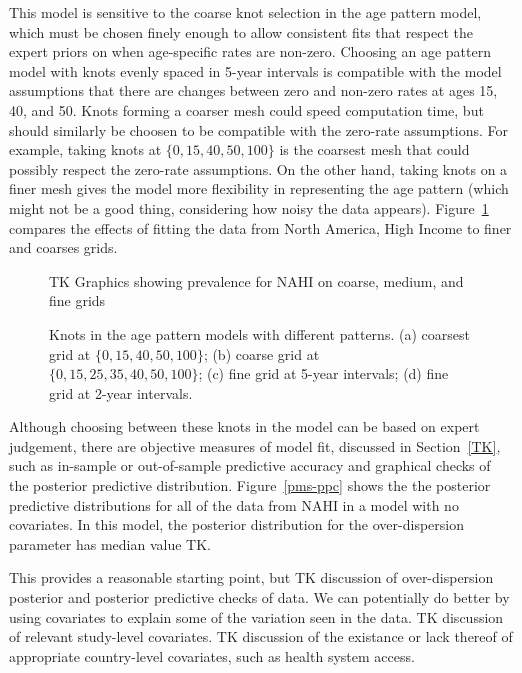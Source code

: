 This model is sensitive to the coarse knot selection in the age
pattern model, which must be chosen finely enough to allow consistent
fits that respect the expert priors on when age-specific rates are
non-zero.  Choosing an age pattern model with knots evenly spaced in
5-year intervals is compatible with the model assumptions that there
are changes between zero and non-zero rates at ages 15, 40, and 50.
Knots forming a coarser mesh could speed computation time, but should similarly be
choosen to be compatible with the zero-rate assumptions.  For example,
taking knots at $\{0,15,40,50,100\}$ is the coarsest mesh that could
possibly respect the zero-rate assumptions.  On the other hand, taking
knots on a finer mesh gives the model more flexibility in representing
the age pattern (which might not be a good thing, considering how
noisy the data appears).  Figure~\ref{pms-grids} compares the effects
of fitting the data from North America, High Income to finer and coarses grids.
\begin{figure}
\begin{center}
TK Graphics showing prevalence for NAHI on coarse, medium, and fine grids
\end{center}
\caption{Knots in the age pattern models with different patterns. (a)
  coarsest grid at $\{0,15,40,50,100\}$; (b) coarse grid at
  $\{0,15,25,35,40,50,100\}$;
  (c) fine grid at 5-year intervals; (d) fine grid at 2-year intervals.}
\label{pms-grids}
\end{figure}

Although choosing between these knots in the model can be based on
expert judgement, there are objective measures of model fit, discussed
in Section~\ref{TK}, such as in-sample or out-of-sample predictive
accuracy and graphical checks of the posterior predictive
distribution.  Figure~\ref{pms-ppc} shows the the posterior predictive distributions for all of
the data from NAHI in a model with no covariates.  In this model, the
posterior distribution for the over-dispersion parameter has median
value TK.

This provides a reasonable starting point, but TK discussion of
over-dispersion posterior and posterior predictive checks of data.  We
can potentially do better by using covariates to explain some of the
variation seen in the data.  TK discussion of relevant study-level
covariates.  TK discussion of the existance or lack thereof of
appropriate country-level covariates, such as health system access.

